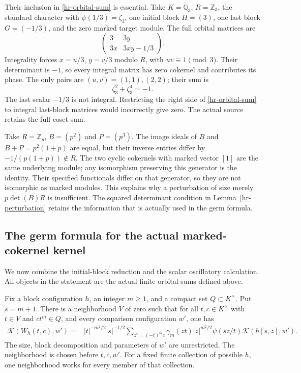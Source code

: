 \begin{remark}
Their inclusion in \eqref{hr-orbital-sum} is essential.
Take $K=\mathbb Q_3$, $R=\mathbb Z_3$, the standard character
with $\psi(1/3)=\zeta_3$, one initial block $H=(3)$,
one last block $G=(-1/3)$, and the zero marked target module.
The full orbital matrices are
\[
 \begin{pmatrix}3&3y\\3x&3xy-1/3\end{pmatrix}.
\]
Integrality forces $x=u/3$, $y=v/3$ modulo $R$, with
$uv\equiv1\pmod3$. Their determinant is $-1$, so every
integral matrix has zero cokernel and contributes its phase.
The only pairs are $(u,v)=(1,1),(2,2)$; their sum is
\[
             \zeta_3^2+\zeta_3^4=-1.
\]
The last scalar $-1/3$ is not integral. Restricting the right
side of \eqref{hr-orbital-sum} to integral last-block matrices
would incorrectly give zero. The actual source retains the
full coset sum.
\end{remark}

\begin{remark}
Take $R=\mathbb Z_p$, $B=(p^2)$ and $P=(p^3)$.
The image ideals of $B$ and $B+P=p^2(1+p)$ are equal, but
their inverse entries differ by
$-1/(p(1+p))\notin R$. The two cyclic cokernels with marked
vector $[1]$ are the same underlying module; any isomorphism
preserving this generator is the identity. Their specified
functionals differ on that generator, so they are not
isomorphic as marked modules. This explains why a perturbation
of size merely $p\det(B)R$ is insufficient. The squared
determinant condition in Lemma~\ref{hr-perturbation} retains
the information that is actually used in the germ formula.
\end{remark}


\subsection{The germ formula for the actual marked-cokernel kernel}
\label{ga-section}

We now combine the initial-block reduction and the scalar
oscillatory calculation.  All objects in the statement are
the actual finite orbital sums defined above.

\begin{theorem}\label{ga-actual-germ}
Fix a block configuration $h$, an integer $m\ge1$, and a
compact set $Q\subset K^\times$.  Put $s=m+1$.
There is a neighborhood $V$ of zero such that for all
$t,c\in K^\times$ with $t\in V$ and $ct^m\in Q$, and every
comparison configuration $w'$, one has
\begin{align}\label{ga-actual-kernel-formula}
 \mathcal K(W_h(t,c),w')
 ={}&|t|^{-m^2/2}|s|^{-1/2}
       \sum_{z^s=(-t)^mc}\gamma_m(zt)|z|^{m^2/2}
          \psi(sz/t)\mathcal K(h[s,z],w').
\end{align}
The size, block decomposition and parameters of $w'$ are
unrestricted.  The neighborhood is chosen before $t,c,w'$.
For a fixed finite collection of possible $h$, one neighborhood
works for every member of that collection.
\end{theorem}

